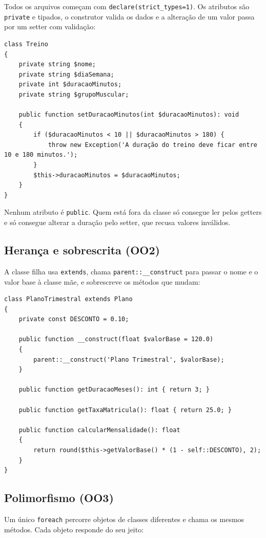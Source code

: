 \documentclass[12pt,a4paper]{article}
\begin{document}
Todos os arquivos começam com \texttt{declare(strict\_types=1)}. Os atributos são \texttt{private} e tipados, o construtor valida os dados e a alteração de um valor passa por um setter com validação:

\begin{lstlisting}
class Treino
{
    private string $nome;
    private string $diaSemana;
    private int $duracaoMinutos;
    private string $grupoMuscular;

    public function setDuracaoMinutos(int $duracaoMinutos): void
    {
        if ($duracaoMinutos < 10 || $duracaoMinutos > 180) {
            throw new Exception('A duração do treino deve ficar entre 10 e 180 minutos.');
        }
        $this->duracaoMinutos = $duracaoMinutos;
    }
}
\end{lstlisting}

Nenhum atributo é \texttt{public}. Quem está fora da classe só consegue ler pelos getters e só consegue alterar a duração pelo setter, que recusa valores inválidos.

\subsection{Herança e sobrescrita (OO2)}

A classe filha usa \texttt{extends}, chama \texttt{parent::\_\_construct} para passar o nome e o valor base à classe mãe, e sobrescreve os métodos que mudam:

\begin{lstlisting}
class PlanoTrimestral extends Plano
{
    private const DESCONTO = 0.10;

    public function __construct(float $valorBase = 120.0)
    {
        parent::__construct('Plano Trimestral', $valorBase);
    }

    public function getDuracaoMeses(): int { return 3; }

    public function getTaxaMatricula(): float { return 25.0; }

    public function calcularMensalidade(): float
    {
        return round($this->getValorBase() * (1 - self::DESCONTO), 2);
    }
}
\end{lstlisting}

\subsection{Polimorfismo (OO3)}

Um único \texttt{foreach} percorre objetos de classes diferentes e chama os mesmos métodos. Cada objeto responde do seu jeito:
\end{document}

